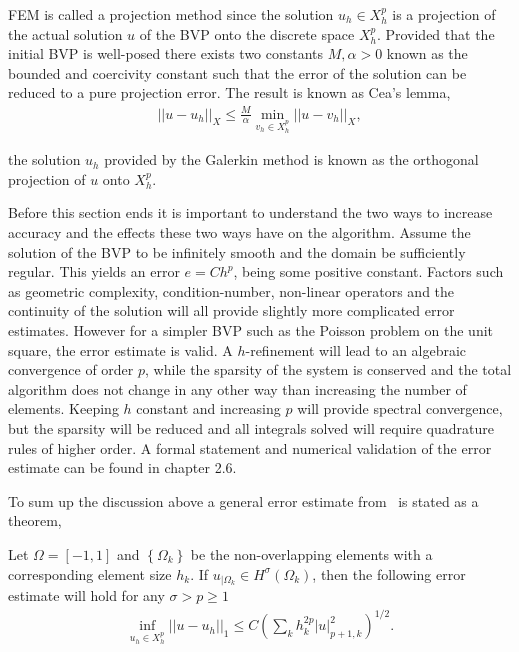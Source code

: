 FEM is called a projection method since the solution $u_h\in X_h^p$ is a projection
of the actual solution $u$ of the BVP onto the discrete space $X_h^p$. Provided that the initial BVP is well-posed there exists two 
constants $M,\alpha>0$ known as the bounded and coercivity constant such that the error of the solution can be reduced to a pure 
projection error. The result is known as Cea's lemma,  
\begin{align}
    ||u-u_h||_X \leq \frac{M}{\alpha}\min_{v_h\in X_h^p}||u-v_h||_X,
    \label{eq:Cea}
\end{align}

the solution $u_h$ provided by the Galerkin method is known as the orthogonal projection of $u$ onto $X_h^p$. 

Before this section ends it is important to understand the two ways to increase accuracy and the effects these two ways have on the algorithm. 
Assume the solution of the BVP to be infinitely smooth and the domain be sufficiently regular. 
This yields an error $e = Ch^p$, being some positive constant.
Factors such as geometric complexity, condition-number, non-linear operators and the continuity of the 
solution will all provide slightly more complicated error estimates. 
However for a simpler BVP such as the Poisson problem on the unit square, the error estimate is valid.  
A $h$-refinement will lead to an algebraic convergence of order $p$, while the sparsity of the system is conserved
and the total algorithm does not change in any other way than increasing the number of elements.
Keeping $h$ constant and increasing $p$ will provide spectral convergence, but the sparsity will be reduced and all integrals solved will require 
quadrature rules of higher order. A formal statement and numerical validation of the error estimate can be found in \cite{Karniadakis} chapter 2.6.  

To sum up the discussion above a general error estimate from~\cite{Quarteroni} is stated as a theorem, 
\begin{theorem}
    Let $\Omega = [-1,1]$ and $\left\{ \Omega_k \right\}$ 
    be the non-overlapping elements with a corresponding element size $h_k$.
    If $u_{|\Omega_k} \in H^{\sigma}(\Omega_k)$, 
    then the following error estimate will hold for any $ \sigma > p \ge 1$ 
\begin{align}
    \inf_{u_h \in X_h^p} ||u-u_h||_1 \le C\left( \sum_{k} h_k^{2p}|u|^2_{p+1,k} \right)^{1/2}.
\end{align}
    \label{thm:femconvergence}
\end{theorem}
%

